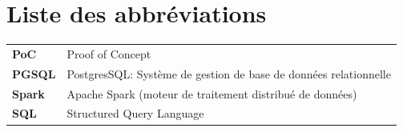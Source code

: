 \chapter*{Liste des abbréviations}


\thispagestyle{plain}

\begin{tabular}{ll}
\textbf{PoC} & Proof of Concept \\
\textbf{PGSQL} & PostgresSQL: Système de gestion de base de données relationnelle \\
\textbf{Spark} & Apache Spark (moteur de traitement distribué de données) \\
\textbf{SQL} & Structured Query Language \\
\end{tabular}

\newpage
